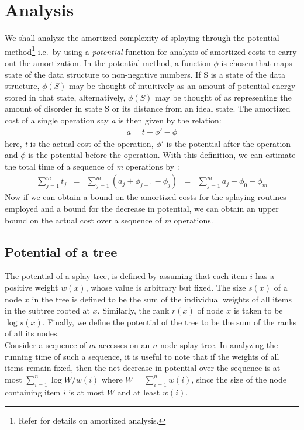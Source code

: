 \documentclass{article}
\begin{document}
\section{Analysis}
We shall analyze the amortized complexity of splaying through the potential method\footnote{Refer \cite{amort} for details on amortized analysis.} i.e.~by using a \emph{potential} function for analysis of amortized costs to carry out the amortization. In the potential method, a function $\phi$ is chosen that maps state of the data structure to non-negative numbers. If S is a state of the data structure, $\phi(S)$ may be thought of intuitively as an amount of potential energy stored in that state, alternatively, $\phi(S)$ may be thought of as representing the amount of disorder in state S or its distance from an ideal state. The amortized cost of a single operation say \emph{a} is then given by the relation:
\begin{align}
\label{eq:amc}
a = t+\phi ' - \phi
\end{align}
here, \emph{t} is the actual cost of the operation, $\phi '$ is the potential after the operation and $\phi$ is the potential before the operation. With this definition, we can estimate the total time of a sequence of \emph{m} operations by :
\begin{align}
\label{eq:tamc}
\sum_{j=1}^m t_j &=& \sum_{j=1}^m(a_j + \phi_{j-1} - \phi_{j}) &=& \sum_{j=1}^m a_j + \phi_0 - \phi_m
\end{align}
Now if we can obtain a bound on the amortized costs for the splaying routines employed and a bound for the decrease in potential, we can obtain an upper bound on the actual cost over a sequence of \emph{m} operations.
\subsection{Potential of a tree}
The potential of a splay tree, is defined by assuming that each item $i$ has a positive weight $w(x)$, whose value is arbitrary but fixed. The size $s(x)$ of a node $x$ in the tree is defined to be the sum of the individual weights of all items in the subtree rooted at $x$. Similarly, the rank $r(x)$ of node $x$ is taken to be $\log{s(x)}$. Finally, we define the potential of the tree to be the sum of the ranks of all its nodes.\\
Consider a sequence of $m$ accesses on an $n$-node splay tree. In analyzing the running time of such a sequence, it is useful to note that if the weights of all items remain fixed, then the net decrease in potential over the sequence is at most $\sum_{i=1}^n \log{W/w(i)}$ where $W=\sum_{i=1}^n w(i)$, since the size of the node containing item $i$ is at most $W$ and at least $w(i)$.
\end{document}
